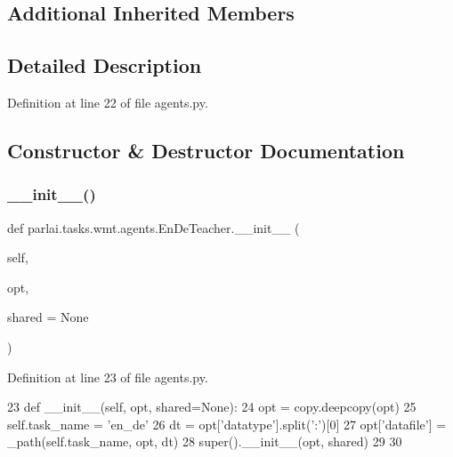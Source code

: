 \subsection*{Additional Inherited Members}


\subsection{Detailed Description}


Definition at line 22 of file agents.\+py.



\subsection{Constructor \& Destructor Documentation}
\mbox{\label{classparlai_1_1tasks_1_1wmt_1_1agents_1_1EnDeTeacher_ac069783e0b57da33c6d1b1ff8d9791bc}} 
\subsubsection{\texorpdfstring{\+\_\+\+\_\+init\+\_\+\+\_\+()}{\_\_init\_\_()}}
{\footnotesize\ttfamily def parlai.\+tasks.\+wmt.\+agents.\+En\+De\+Teacher.\+\_\+\+\_\+init\+\_\+\+\_\+ (\begin{DoxyParamCaption}\item[{}]{self,  }\item[{}]{opt,  }\item[{}]{shared = {\ttfamily None} }\end{DoxyParamCaption})}



Definition at line 23 of file agents.\+py.


\begin{DoxyCode}
23     \textcolor{keyword}{def }\_\_init\_\_(self, opt, shared=None):
24         opt = copy.deepcopy(opt)
25         self.task\_name = \textcolor{stringliteral}{'en\_de'}
26         dt = opt[\textcolor{stringliteral}{'datatype'}].split(\textcolor{stringliteral}{':'})[0]
27         opt[\textcolor{stringliteral}{'datafile'}] = \_path(self.task\_name, opt, dt)
28         super().\_\_init\_\_(opt, shared)
29 
30 
\end{DoxyCode}


